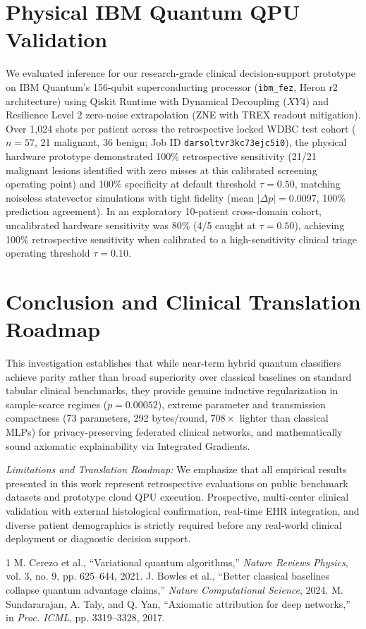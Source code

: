 \documentclass[conference]{IEEEtran}
\begin{document}
\section{Physical IBM Quantum QPU Validation}
We evaluated inference for our research-grade clinical decision-support prototype on IBM Quantum's 156-qubit superconducting processor (\texttt{ibm\_fez}, Heron r2 architecture) using Qiskit Runtime with Dynamical Decoupling ($XY4$) and Resilience Level 2 zero-noise extrapolation (ZNE with TREX readout mitigation). Over 1,024 shots per patient across the retrospective locked WDBC test cohort ($n=57$, 21 malignant, 36 benign; Job ID \texttt{darsoltvr3kc73ejc5i0}), the physical hardware prototype demonstrated 100\% retrospective sensitivity (21/21 malignant lesions identified with zero misses at this calibrated screening operating point) and 100\% specificity at default threshold $\tau=0.50$, matching noiseless statevector simulations with tight fidelity (mean $|\Delta p| = 0.0097$, 100\% prediction agreement). In an exploratory 10-patient cross-domain cohort, uncalibrated hardware sensitivity was 80\% (4/5 caught at $\tau=0.50$), achieving 100\% retrospective sensitivity when calibrated to a high-sensitivity clinical triage operating threshold $\tau=0.10$.

\section{Conclusion and Clinical Translation Roadmap}
This investigation establishes that while near-term hybrid quantum classifiers achieve parity rather than broad superiority over classical baselines on standard tabular clinical benchmarks, they provide genuine inductive regularization in sample-scarce regimes ($p=0.00052$), extreme parameter and transmission compactness (73 parameters, 292 bytes/round, $708\times$ lighter than classical MLPs) for privacy-preserving federated clinical networks, and mathematically sound axiomatic explainability via Integrated Gradients.

\textit{Limitations and Translation Roadmap:} We emphasize that all empirical results presented in this work represent retrospective evaluations on public benchmark datasets and prototype cloud QPU execution. Prospective, multi-center clinical validation with external histological confirmation, real-time EHR integration, and diverse patient demographics is strictly required before any real-world clinical deployment or diagnostic decision support.


\begin{thebibliography}{1}
 M. Cerezo et al., ``Variational quantum algorithms,'' \emph{Nature Reviews Physics}, vol. 3, no. 9, pp. 625--644, 2021.
 J. Bowles et al., ``Better classical baselines collapse quantum advantage claims,'' \emph{Nature Computational Science}, 2024.
 M. Sundararajan, A. Taly, and Q. Yan, ``Axiomatic attribution for deep networks,'' in \emph{Proc. ICML}, pp. 3319--3328, 2017.
\end{thebibliography}
\end{document}
